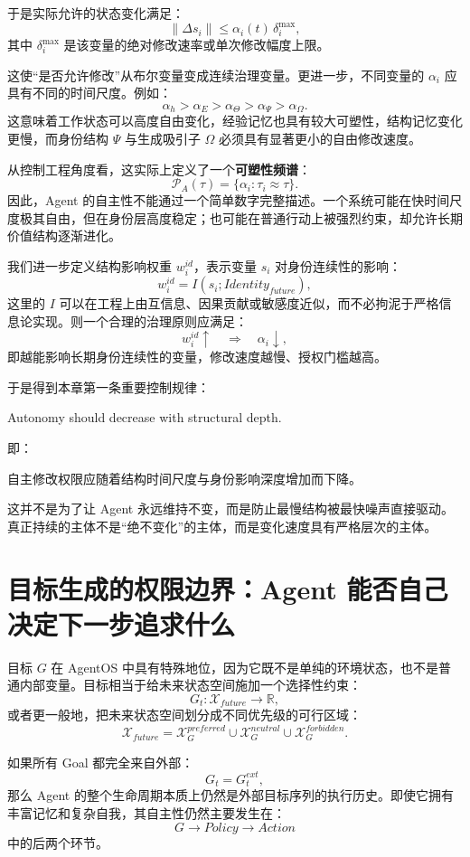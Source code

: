 于是实际允许的状态变化满足：
\[
\|\Delta s_i\|
\le
\alpha_i(t)\,\delta_i^{\max},
\]
其中 $\delta_i^{\max}$ 是该变量的绝对修改速率或单次修改幅度上限。

这使“是否允许修改”从布尔变量变成连续治理变量。更进一步，不同变量的 $\alpha_i$ 应具有不同的时间尺度。例如：
\[
\alpha_h
>
\alpha_E
>
\alpha_\Theta
>
\alpha_\Psi
>
\alpha_\Omega.
\]
这意味着工作状态可以高度自由变化，经验记忆也具有较大可塑性，结构记忆变化更慢，而身份结构 $\Psi$ 与生成吸引子 $\Omega$ 必须具有显著更小的自由修改速度。

从控制工程角度看，这实际上定义了一个\textbf{可塑性频谱}：
\[
\boxed{
\mathcal P_A(\tau)
=
\{
\alpha_i:
\tau_i\approx\tau
\}.
}
\]
因此，Agent 的自主性不能通过一个简单数字完整描述。一个系统可能在快时间尺度极其自由，但在身份层高度稳定；也可能在普通行动上被强烈约束，却允许长期价值结构逐渐进化。

我们进一步定义结构影响权重 $w_i^{id}$，表示变量 $s_i$ 对身份连续性的影响：
\[
w_i^{id}
=
I(s_i;Identity_{future}),
\]
这里的 $I$ 可以在工程上由互信息、因果贡献或敏感度近似，而不必拘泥于严格信息论实现。则一个合理的治理原则应满足：
\[
w_i^{id}\uparrow
\quad\Rightarrow\quad
\alpha_i\downarrow,
\]
即越能影响长期身份连续性的变量，修改速度越慢、授权门槛越高。

于是得到本章第一条重要控制规律：
\begin{proposition*}
Autonomy should decrease with structural depth.
\end{proposition*}
即：
\begin{statementbox}
自主修改权限应随着结构时间尺度与身份影响深度增加而下降。
\end{statementbox}

这并不是为了让 Agent 永远维持不变，而是防止最慢结构被最快噪声直接驱动。真正持续的主体不是“绝不变化”的主体，而是变化速度具有严格层次的主体。

\section{目标生成的权限边界：Agent 能否自己决定下一步追求什么}

目标 $G$ 在 AgentOS 中具有特殊地位，因为它既不是单纯的环境状态，也不是普通内部变量。目标相当于给未来状态空间施加一个选择性约束：
\[
G_t:
\mathcal X_{future}
\rightarrow
\mathbb R,
\]
或者更一般地，把未来状态空间划分成不同优先级的可行区域：
\[
\mathcal X_{future}
=
\mathcal X_G^{preferred}
\cup
\mathcal X_G^{neutral}
\cup
\mathcal X_G^{forbidden}.
\]

如果所有 Goal 都完全来自外部：
\[
G_t
=
G_t^{ext},
\]
那么 Agent 的整个生命周期本质上仍然是外部目标序列的执行历史。即使它拥有丰富记忆和复杂自我，其自主性仍然主要发生在：
\[
G\rightarrow Policy\rightarrow Action
\]
中的后两个环节。

